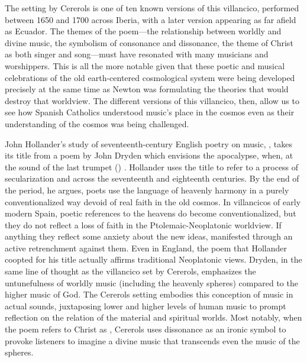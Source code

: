 
The setting by Cererols is one of ten known versions of this villancico,
performed between 1650 and 1700 across Iberia, with a later version appearing as
far afield as Ecuador.
The themes of the poem---the relationship between worldly and divine music, the
symbolism of consonance and dissonance, the theme of Christ as both singer and
song---must have resonated with many musicians and worshippers.
This is all the more notable given that these poetic and musical celebrations of
the old earth-centered cosmological system were being developed precisely at the
same time as Newton was formulating the theories that would destroy that
worldview.
The different versions of this villancico, then, allow us to see how Spanish
Catholics understood music's place in the cosmos even as their understanding of
the cosmos was being challenged.


John Hollander's study of seventeenth-century English poetry on music,
, takes its title from a poem by John Dryden
which envisions the apocalypse, when, at the sound of the last trumpet
() .%
    \Autocites
    {Dryden:Alexander}
    {Hollander:Untuning}
Hollander uses the title to refer to a process of secularization and
 across the seventeenth and eighteenth centuries.
By the end of the period, he argues, poets use the language of heavenly harmony
in a purely conventionalized way devoid of real faith in the old cosmos.
In villancicos of early modern Spain, poetic references to the heavens do
become conventionalized, but they do not reflect a loss of faith in the
Ptolemaic-Neoplatonic worldview.
If anything they reflect some anxiety about the new ideas, manifested through
an active retrenchment against them.
Even in England, the poem that Hollander coopted for his title actually affirms
traditional Neoplatonic views.
Dryden, in the same line of thought as the villancico set by Cererols,
emphasizes the untunefulness of worldly music (including the heavenly spheres)
compared to the higher music of God.
The Cererols setting embodies this conception of music in actual sounds,
juxtaposing lower and higher levels of human music to prompt reflection on the
relation of the material and spiritual worlds.
Most notably, when the poem refers to Christ as ,
Cererols uses dissonance as an ironic symbol to provoke listeners to imagine a
divine music that transcends even the music of the spheres.

